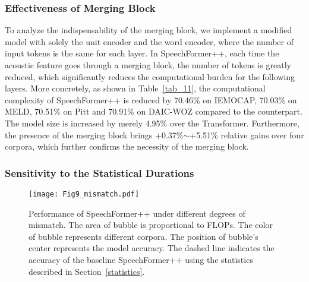 \documentclass[lettersize,journal]{IEEEtran}
\begin{document}
\subsubsection{Effectiveness of Merging Block} To analyze the indispensability of the merging block, we implement a modified model with solely the unit encoder and the word encoder, where the number of input tokens is the same for each layer. In SpeechFormer++, each time the acoustic feature goes through a merging block, the number of tokens is greatly reduced, which significantly reduces the computational burden for the following layers. More concretely, as shown in Table~\ref{tab_11}, the computational complexity of SpeechFormer++ is reduced by 70.46\% on IEMOCAP, 70.03\% on MELD, 70.51\% on Pitt and 70.91\% on DAIC-WOZ compared to the counterpart. The model size is increased by merely 4.95\% over the Transformer. Furthermore, the presence of the merging block brings +0.37\%$\sim$+5.51\% relative gains over four corpora, which further confirms the necessity of the merging block.

\subsubsection{Sensitivity to the Statistical Durations}

\begin{figure}[t]
\centering
\texttt{[image: Fig9\_mismatch.pdf]}
\caption{Performance of SpeechFormer++ under different degrees of mismatch. The area of bubble is proportional to FLOPs. The color of bubble represents different corpora. The position of bubble's center represents the model accuracy. The dashed line indicates the accuracy of the baseline SpeechFormer++ using the statistics described in Section~\ref{statistics}.}
\label{fig_7}
\end{figure}
\end{document}
